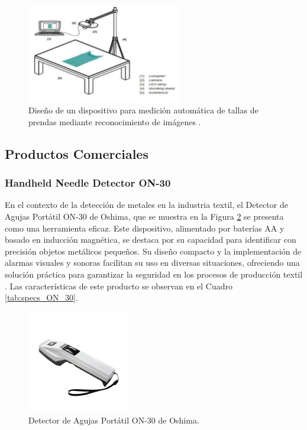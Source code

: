 \begin{figure}[H]
	\centering
	\includegraphics[width=0.6\textwidth]{img/Automatic_Measurement.png}
	\caption[Diseño de un dispositivo para medición automática de tallas de prendas mediante reconocimiento de imágenes]{Diseño de un dispositivo para medición automática de tallas de prendas mediante reconocimiento de imágenes \cite{Li2017AutomaticMeasurement}.}
	\label{fig:Automatic_Measurement}
\end{figure}

\subsection{Productos Comerciales}

\subsubsection{Handheld Needle Detector ON-30}

En el contexto de la detección de metales en la industria textil, el Detector de Agujas Portátil ON-30 de Oshima, que se muestra en la Figura \ref{fig:oshima_on_30} se presenta como una herramienta eficaz. Este dispositivo, alimentado por baterías AA y basado en inducción magnética, se destaca por su capacidad para identificar con precisión objetos metálicos pequeños. Su diseño compacto y la implementación de alarmas visuales y sonoras facilitan su uso en diversas situaciones, ofreciendo una solución práctica para garantizar la seguridad en los procesos de producción textil \cite{oshimaEfficientHandheld}. Las características de este producto se observan en el Cuadro \ref{tab:specs_ON_30}.

\begin{figure}[H]
	\centering
	\includegraphics[width=0.4\textwidth]{img/oshima_on_30.png}
	\caption{Detector de Agujas Portátil ON-30 de Oshima.}
	\label{fig:oshima_on_30}
\end{figure}

